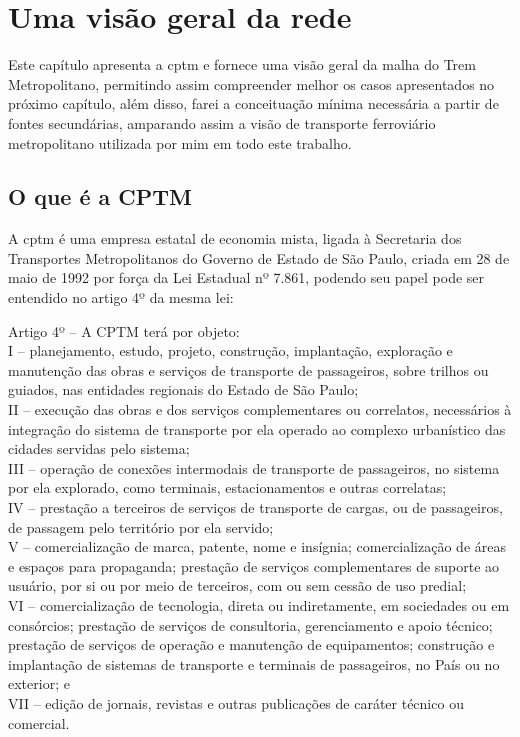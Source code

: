 	\chapter{Uma visão geral da rede}
	
	Este capítulo apresenta a \gls{cptm} e fornece uma visão geral da malha do Trem Metropolitano, permitindo assim compreender melhor os casos apresentados no próximo capítulo, além disso, farei a conceituação mínima necessária a partir de fontes secundárias, amparando assim a visão de transporte ferroviário metropolitano utilizada por mim em todo este trabalho.
	
%
%
	
	\section{O que é a CPTM}
	
	A {\glsdesc*{cptm}} é uma empresa estatal de economia mista, ligada à Secretaria dos Transportes Metropolitanos do Governo de Estado de São Paulo, criada em 28 de maio de 1992 por força da Lei Estadual nº 7.861\cite{sitecptm1}, podendo seu papel pode ser entendido no artigo 4º da mesma lei:
	
	\begin{citacao}
	 	Artigo 4º -- A CPTM terá por objeto:\\
		I -- planejamento, estudo, projeto, construção, implantação, exploração e manutenção das obras e serviços de transporte de passageiros, sobre trilhos ou guiados, nas entidades regionais do Estado de São Paulo;\\
		II -- execução das obras e dos serviços complementares ou correlatos, necessários à integração do sistema de transporte por ela operado ao complexo urbanístico das cidades servidas pelo sistema; \\
		III --  operação de conexões intermodais de transporte de passageiros, no sistema por ela explorado, como terminais, estacionamentos e outras correlatas;\\
		IV -- prestação a terceiros de serviços de transporte de cargas, ou de passageiros, de passagem pelo território por ela servido;\\
		V -- comercialização de marca, patente, nome e insígnia; comercialização de áreas e espaços para propaganda; prestação de serviços complementares de suporte ao usuário, por si ou por meio de terceiros, com ou sem cessão de uso predial;\\
		VI -- comercialização de tecnologia, direta ou indiretamente, em sociedades ou em consórcios; prestação de serviços de consultoria, gerenciamento e apoio técnico; prestação de serviços de operação e manutenção de equipamentos; construção e implantação de sistemas de transporte e terminais de passageiros, no País ou no exterior; e\\
		VII -- edição de jornais, revistas e outras publicações de caráter técnico ou comercial.\cite{lei7861}
	\end{citacao}
	
